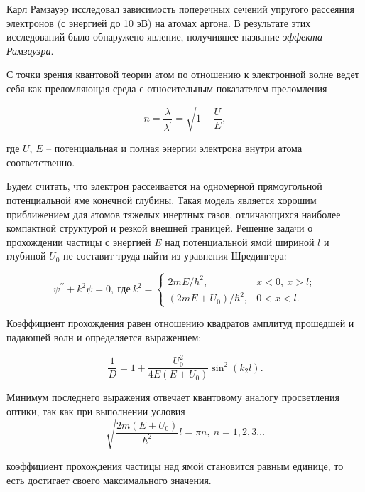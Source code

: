 \documentclass[a4paper, 12pt]{article}
\begin{document}
    Карл Рамзауэр исследовал зависимость поперечных сечений упругого рассеяния электронов (с энергией до 10 эВ) на атомах аргона. В результате этих исследований было обнаружено явление, получившее название \textit{эффекта Рамзауэра}.
	
    С точки зрения квантовой теории атом по отношению к электронной волне ведет себя как преломляющая среда с относительным показателем преломления
    
    \begin{equation}
        n = \frac{\lambda}{\lambda^\prime} = \sqrt{1-\frac{U}{E}},
    \end{equation}
    
    где $U$, $E$ -- потенциальная и полная энергии электрона внутри атома соответственно.
	
    Будем считать, что электрон рассеивается на одномерной прямоугольной потенциальной яме конечной глубины. Такая модель является хорошим приближением для атомов тяжелых инертных газов, отличающихся наиболее компактной структурой и резкой внешней границей. Решение задачи о прохождении частицы с энергией $E$ над потенциальной ямой шириной $l$ и глубиной $U_0$ не составит труда найти из уравнения Шредингера:
    
    \begin{equation}
        \psi^{\prime\prime} + k^2\psi = 0, \ \text{где}\
        k^2 = \begin{cases}
            2mE/\hbar^2, & x < 0, \ x  >l; \\
            (2mE+U_0)/\hbar^2, & 0 < x < l.
        \end{cases}
    \end{equation}
    
    Коэффициент прохождения равен отношению квадратов амплитуд прошедшей и падающей волн и определяется выражением:
    
    \begin{equation}
        \frac{1}{D} = 1 + \frac{U_0^2}{4E(E+U_0)}\sin^2(k_2l).
    \end{equation}
    
    Минимум последнего выражения отвечает квантовому аналогу просветления оптики, так как при выполнении условия
	\begin{equation}
		\label{eq:condition}
		\sqrt{\frac{2m(E+U_0)}{\hbar^2}}l = \pi n, \ n = 1, 2, 3 \dots
	\end{equation}
	
    коэффициент прохождения частицы над ямой становится равным единице, то есть достигает своего максимального значения.
    
\end{document}
